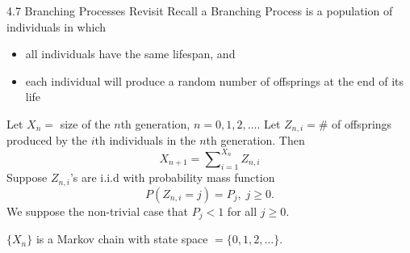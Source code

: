 \documentclass[letterpaper, mathserif]{beamer}
\def\p{\mathrm P}
\def\Sum{\sum\nolimits}
\begin{document}
\begin{frame}{4.7 Branching Processes Revisit}
Recall a Branching Process is a population of individuals in which
\begin{itemize}
\item all individuals have the same lifespan, and
\item each individual will produce a random number of offsprings at the end of its life
\end{itemize}
Let $X_n=$ size of the $n$th generation, $n=0,1,2,\ldots$.
Let $Z_{n,i}=\#$ of offsprings produced by the $i$th individuals in the $n$th generation. Then
\begin{equation}\label{eq:branching}
X_{n+1} =\Sum_{i=1}^{X_{n}}Z_{n,i}
\end{equation}
Suppose  $Z_{n,i}$'s are i.i.d with probability mass function
$$P(Z_{n,i}=j)=P_j,\; j \ge 0.$$
We suppose the non-trivial case that $P_j < 1$ for all $j \ge 0$.

$\{X_n\}$ is a Markov chain with state space $=\{0,1,2,\ldots\}$.
\end{frame}
\end{document}
